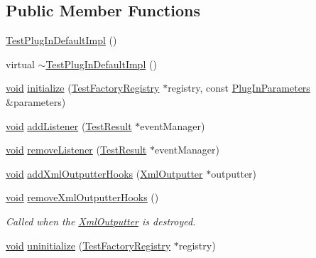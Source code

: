 \subsection*{Public Member Functions}
\begin{DoxyCompactItemize}
\item 
\hyperlink{class_test_plug_in_default_impl_a47fd7f8f4bf3faad9118c3319a31b4c8}{Test\-Plug\-In\-Default\-Impl} ()
\item 
virtual \hyperlink{class_test_plug_in_default_impl_abd24e4636ca281cfe40ab07103862896}{$\sim$\-Test\-Plug\-In\-Default\-Impl} ()
\item 
\hyperlink{wglew_8h_aeea6e3dfae3acf232096f57d2d57f084}{void} \hyperlink{class_test_plug_in_default_impl_a37c0b83c0a94ef97113b35ae70316883}{initialize} (\hyperlink{class_test_factory_registry}{Test\-Factory\-Registry} $\ast$registry, const \hyperlink{class_plug_in_parameters}{Plug\-In\-Parameters} \&parameters)
\item 
\hyperlink{wglew_8h_aeea6e3dfae3acf232096f57d2d57f084}{void} \hyperlink{class_test_plug_in_default_impl_a0180a801dd78be5741a200e866684b20}{add\-Listener} (\hyperlink{class_test_result}{Test\-Result} $\ast$event\-Manager)
\item 
\hyperlink{wglew_8h_aeea6e3dfae3acf232096f57d2d57f084}{void} \hyperlink{class_test_plug_in_default_impl_a26364a3a81e48ff9adcef1a5cd3e40df}{remove\-Listener} (\hyperlink{class_test_result}{Test\-Result} $\ast$event\-Manager)
\item 
\hyperlink{wglew_8h_aeea6e3dfae3acf232096f57d2d57f084}{void} \hyperlink{class_test_plug_in_default_impl_aed4c5b89adaa0bb0b4f11cc4aca782a2}{add\-Xml\-Outputter\-Hooks} (\hyperlink{class_xml_outputter}{Xml\-Outputter} $\ast$outputter)
\item 
\hyperlink{wglew_8h_aeea6e3dfae3acf232096f57d2d57f084}{void} \hyperlink{class_test_plug_in_default_impl_aa4fa891e799ff362dece734417afd93d}{remove\-Xml\-Outputter\-Hooks} ()
\begin{DoxyCompactList}\small\item\em Called when the \hyperlink{class_xml_outputter}{Xml\-Outputter} is destroyed. \end{DoxyCompactList}\item 
\hyperlink{wglew_8h_aeea6e3dfae3acf232096f57d2d57f084}{void} \hyperlink{class_test_plug_in_default_impl_aab567f339bbda38e759b7bd631ad8b8c}{uninitialize} (\hyperlink{class_test_factory_registry}{Test\-Factory\-Registry} $\ast$registry)
\end{DoxyCompactItemize}


